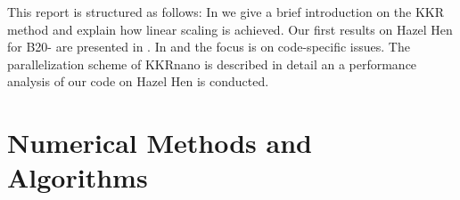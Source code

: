 \documentclass [a4paper, 12pt]{article}
\begin{document}
This report is structured as follows:
In  we give a brief introduction on the KKR method and explain how
linear scaling is achieved.
Our first results on Hazel Hen for B20- are presented in .
In  and  the focus is on code-specific issues. 
The parallelization scheme of KKRnano
is described in detail an a performance analysis of our code on Hazel Hen is conducted.

\section{Numerical Methods and Algorithms}
\label{sec:methods_algorithms}
 
\end{document}
